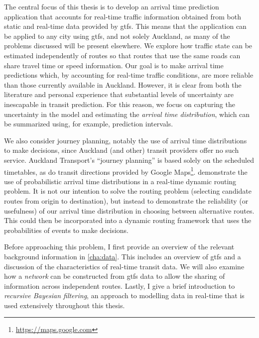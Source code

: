 The central focus of this thesis is to develop an arrival time prediction application that accounts for real-time traffic information obtained from both static and real-time data provided by \gls{gtfs}. This means that the application can be applied to any city using \gls{gtfs}, and not solely Auckland, as many of the problems discussed will be present elsewhere. We explore how traffic state can be estimated independently of routes so that routes that use the same roads can share travel time or speed information. Our goal is to make arrival time predictions which, by accounting for real-time traffic conditions, are more reliable than those currently available in Auckland. However, it is clear from both the literature and personal experience that substantial levels of uncertainty are inescapable in transit prediction. For this reason, we focus on capturing the uncertainty in the model and estimating the \emph{arrival time distribution}, which can be summarized using, for example, prediction intervals.


We also consider journey planning, notably the use of arrival time distributions to make decisions, since Auckland (and other) transit providers offer no such service. Auckland Transport's ``journey planning'' is based solely on the scheduled timetables, as do transit directions provided by Google Maps\footnote{\url{https://maps.google.com}}.  demonstrate the use of probabilistic arrival time distributions in a real-time dynamic routing problem. It is not our intention to solve the routing problem (selecting candidate routes from origin to destination), but instead to demonstrate the reliability (or usefulness) of our arrival time distribution in choosing between alternative routes. This could then be incorporated into a dynamic routing framework that uses the probabilities of events to make decisions.


Before approaching this problem, I first provide an overview of the relevant background information in \cref{cha:data}. This includes an overview of \gls{gtfs} and a discussion of the characteristics of real-time transit data. We will also examine how a \emph{network} can be constructed from \gls{gtfs} data to allow the sharing of information across independent routes. Lastly, I give a brief introduction to \emph{recursive Bayesian filtering}, an approach to modelling data in real-time that is used extensively throughout this thesis.


